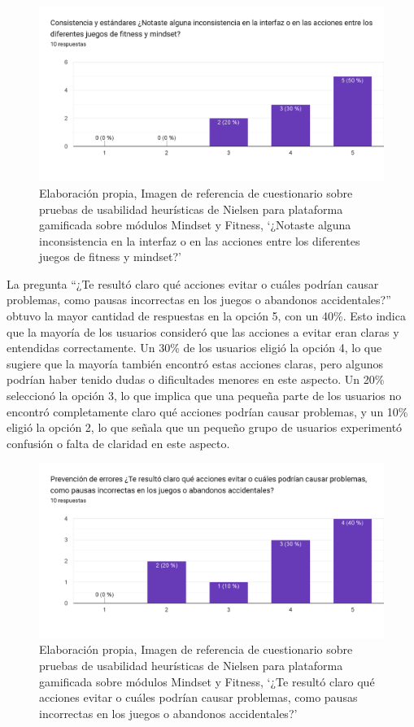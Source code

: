 \begin{figure}[H]
  \centering
  \includegraphics[width=0.7\linewidth]{Imagenes/Nc4.png}
  \caption{Elaboración propia, Imagen de referencia de cuestionario sobre pruebas de usabilidad heurísticas de Nielsen para plataforma gamificada sobre módulos Mindset y Fitness, `¿Notaste alguna inconsistencia en la interfaz o en las acciones entre los diferentes juegos de fitness y mindset?'}

  \label{fig:cuestionario4nielsen}
\end{figure}

La pregunta ``¿Te resultó claro qué acciones evitar o cuáles podrían causar problemas, como pausas incorrectas en los juegos o abandonos accidentales?'' obtuvo la mayor cantidad de respuestas en la opción 5, con un 40\%. Esto indica que la mayoría de los usuarios consideró que las acciones a evitar eran claras y entendidas correctamente. Un 30\% de los usuarios eligió la opción 4, lo que sugiere que la mayoría también encontró estas acciones claras, pero algunos podrían haber tenido dudas o dificultades menores en este aspecto. Un 20\% seleccionó la opción 3, lo que implica que una pequeña parte de los usuarios no encontró completamente claro qué acciones podrían causar problemas, y un 10\% eligió la opción 2, lo que señala que un pequeño grupo de usuarios experimentó confusión o falta de claridad en este aspecto.

\begin{figure}[H]
  \centering
  \includegraphics[width=0.7\linewidth]{Imagenes/Nc5.png}
  \caption{Elaboración propia, Imagen de referencia de cuestionario sobre pruebas de usabilidad heurísticas de Nielsen para plataforma gamificada sobre módulos Mindset y Fitness, `¿Te resultó claro qué acciones evitar o cuáles podrían causar problemas, como pausas incorrectas en los juegos o abandonos accidentales?'}

  \label{fig:cuestionario5nielsen}
\end{figure}

